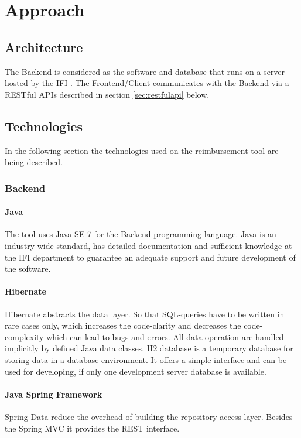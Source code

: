 \chapter{Approach}

\section{Architecture}

The Backend is considered as the software and database that runs on a server hosted by the IFI \cite{ifi}. The Frontend/Client communicates with the Backend via a RESTful APIs described in section \ref{sec:restfulapi} below.

\section{Technologies}

In the following section the technologies used on the reimbursement tool are being described.

\subsection{Backend}

\subsubsection{Java}
The tool uses Java SE 7 for the Backend programming language. Java is an industry wide standard, has detailed documentation and sufficient knowledge at the IFI \cite{ifi} department to guarantee an adequate support and future development of the software.

\subsubsection{Hibernate}
Hibernate abstracts the data layer. So that SQL-queries have to be written in rare cases only, which increases the code-clarity and decreases the code-complexity which can lead to bugs and errors. All data operation are handled implicitly by defined Java data classes.\newline
H2 database is a temporary database for storing data in a database environment. It offers a simple interface and can be used for developing, if only one development server database is available. \cite{hibernate}

\subsubsection{Java Spring Framework}
Spring Data reduce the overhead of building the repository access layer. Besides the Spring MVC it provides the REST interface. \cite{spring}

